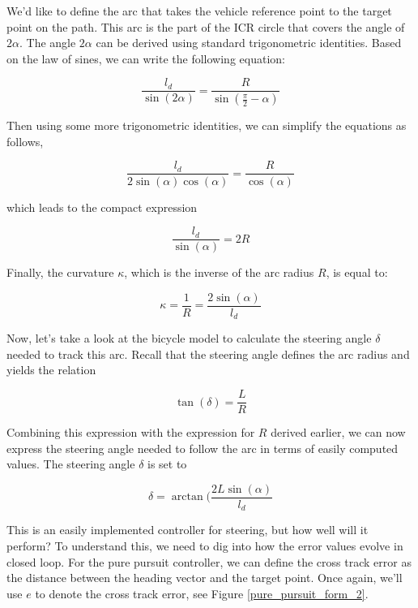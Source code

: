 We'd like to define the arc that takes the vehicle reference point to the target point on the path. 
This arc is the part of the ICR circle that covers the angle of $2\alpha$. The angle $2\alpha$ can be derived using standard trigonometric identities. 
Based on the law of sines, we can write the following equation: 

\begin{equation}
\frac{l_d}{\sin(2\alpha)} = \frac{R}{\sin(\frac{\pi}{2} - \alpha)} 
\end{equation}

Then using some more trigonometric identities, we can simplify the equations as follows, 

\begin{equation}
\frac{l_d}{2\sin(\alpha)\cos(\alpha)} = \frac{R}{\cos(\alpha)} 
\end{equation}

which leads to the compact expression 

\begin{equation}
\frac{l_d}{\sin(\alpha)} = 2R 
\end{equation}

Finally, the curvature $\kappa$, which is the inverse of the arc radius $R$, is equal to:

\begin{equation}
\kappa = \frac{1}{R} = \frac{2\sin(\alpha)}{l_d}
\label{curvature_eq_1}
\end{equation}

Now, let's take a look at the bicycle model to calculate the steering angle $\delta$ needed to track this arc. 
Recall that the steering angle defines the arc radius and yields the relation

\begin{equation}
\tan(\delta) = \frac{L}{R}
\end{equation}

Combining this expression with the expression for $R$ derived earlier, we can now express the steering angle needed to follow the arc in terms of easily computed values. 
The steering angle $\delta$ is set to 

\begin{equation}
\delta = \arctan(\frac{2L\sin(\alpha)}{l_d}
\end{equation}

This is an easily implemented controller for steering, but how well will it perform? To understand this, we need to dig into how the error values evolve in closed loop. 
For the pure pursuit controller, we can define the cross track error as the distance between the heading vector and the target point. 
Once again, we'll use $e$ to denote the cross track error, see Figure \ref{pure_pursuit_form_2}. 

